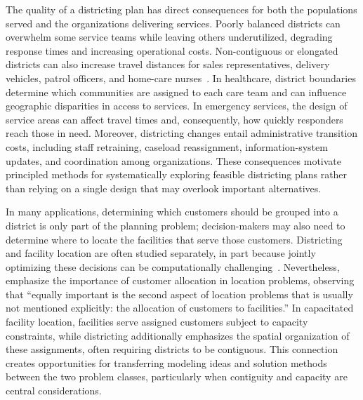 \documentclass[preprint,12pt,authoryear]{elsarticle}
\theoremstyle{definition}
\begin{document}
The quality of a districting plan has direct consequences for both the populations 
served and the organizations delivering services. Poorly balanced districts can 
overwhelm some service teams while leaving others underutilized, degrading response 
times and increasing operational costs. Non-contiguous or elongated districts can 
also increase travel distances for sales representatives, delivery vehicles, patrol 
officers, and home-care nurses~\citep{kalcsics2020districting}. In healthcare, 
district boundaries determine which communities are assigned to each care team and 
can influence geographic disparities in access to services. In emergency services, 
the design of service areas can affect travel times and, consequently, how quickly 
responders reach those in need. Moreover, districting changes entail administrative 
transition costs, including staff retraining, caseload reassignment, information-system
updates, and coordination among organizations. These consequences motivate principled 
methods for systematically exploring feasible districting plans rather than relying 
on a single design that may overlook important alternatives.

In many applications, determining which customers should be grouped into a district 
is only part of the planning problem; decision-makers may also need to determine 
where to locate the facilities that serve those customers. Districting and facility 
location are often studied separately, in part because jointly optimizing these 
decisions can be computationally challenging~\citep{kalcsics2005towards}. Nevertheless, 
\citet{kalcsics2020districting} emphasize the importance of customer 
allocation in location problems, observing that ``equally important is the second 
aspect of location problems that is usually not mentioned explicitly: the allocation 
of customers to facilities.'' In capacitated facility location, facilities serve 
assigned customers subject to capacity constraints, while districting additionally 
emphasizes the spatial organization of these assignments, often requiring districts 
to be contiguous. This connection creates opportunities for transferring modeling 
ideas and solution methods between the two problem classes, particularly when 
contiguity and capacity are central considerations.
\end{document}
